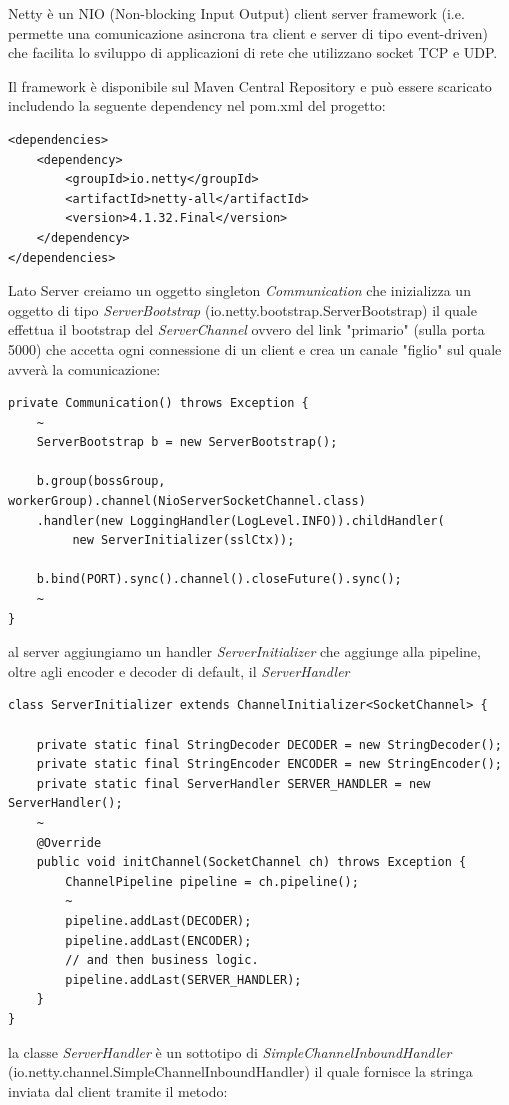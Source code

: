 
Netty è un NIO (Non-blocking Input Output) client server framework (i.e. permette una comunicazione asincrona tra client e server di tipo event-driven) che facilita lo sviluppo di applicazioni di rete che utilizzano socket TCP e UDP.

Il framework è disponibile sul Maven Central Repository e può essere scaricato includendo la seguente dependency nel pom.xml del progetto:
\begin{lstlisting}
<dependencies>
	<dependency>
		<groupId>io.netty</groupId>
		<artifactId>netty-all</artifactId>
		<version>4.1.32.Final</version>
	</dependency>
</dependencies>
\end{lstlisting}


Lato Server creiamo un oggetto singleton \textit{Communication} che inizializza un oggetto di tipo \textit{ServerBootstrap} (io.netty.bootstrap.ServerBootstrap) il quale effettua il bootstrap del \textit{ServerChannel} ovvero del link "primario" (sulla porta 5000) che accetta ogni connessione di un client e crea un canale "figlio" sul quale avverà la comunicazione:
\begin{lstlisting}
private Communication() throws Exception {
	~
	ServerBootstrap b = new ServerBootstrap();

	b.group(bossGroup, workerGroup).channel(NioServerSocketChannel.class)
	.handler(new LoggingHandler(LogLevel.INFO)).childHandler(
		 new ServerInitializer(sslCtx));

	b.bind(PORT).sync().channel().closeFuture().sync();
	~
}
\end{lstlisting}
al server aggiungiamo un handler \textit{ServerInitializer} che aggiunge alla pipeline, oltre agli encoder e decoder di default, il \textit{ServerHandler}
\begin{lstlisting}
class ServerInitializer extends ChannelInitializer<SocketChannel> {

	private static final StringDecoder DECODER = new StringDecoder();
	private static final StringEncoder ENCODER = new StringEncoder();
	private static final ServerHandler SERVER_HANDLER = new ServerHandler();
	~
	@Override
	public void initChannel(SocketChannel ch) throws Exception {
		ChannelPipeline pipeline = ch.pipeline();
		~
		pipeline.addLast(DECODER);
		pipeline.addLast(ENCODER);
		// and then business logic.
		pipeline.addLast(SERVER_HANDLER);
	}
}
\end{lstlisting}
la classe \textit{ServerHandler} è un sottotipo di \textit{SimpleChannelInboundHandler} \\(io.netty.channel.SimpleChannelInboundHandler) il quale fornisce la stringa inviata dal client tramite il metodo:
